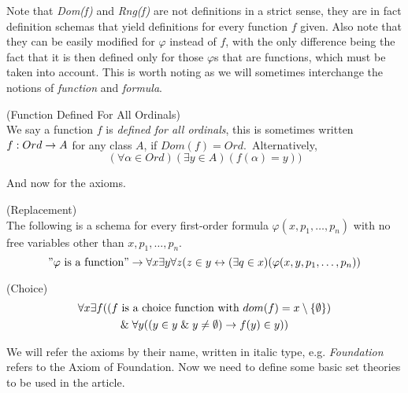 Note that \emph{Dom(f)} and \emph{Rng(f)} are not definitions in a strict sense, they are in fact definition schemas that yield definitions for every function $f$ given. Also note that they can be easily modified for $\varphi$ instead of $f$, with the only difference being the fact that it is then defined only for those $\varphi$s that are functions, which must be taken into account. This is worth noting as we will sometimes interchange the notions of \emph{function} and \emph{formula}.

\begin{definition}{(Function Defined For All Ordinals)}\label{def:function_dfao}\\
We say a function $f$ is \emph{defined for all ordinals}, this is sometimes written $f: Ord \rightarrow A$ for any class $A$, if $Dom(f) = Ord$.\
Alternatively,
\begin{equation}
(\forall \alpha \in Ord)(\exists y \in A)(f(\alpha) = y))
\end{equation}
\end{definition}

And now for the axioms.

\begin{definition}{(Replacement)}\label{def:replacement}\\
The following is a schema for every first-order formula $\varphi(x, p_1, \ldots, p_n)$ with no free variables other than $x, p_1, \ldots, p_n$.
\begin{equation}
"\varphi\mbox{ is a function}"\rightarrow \forall x \exists y \forall z (z \in y \leftrightarrow (\exists q \in x)(\varphi(x, y, p_1, \ldots, p_n))
\end{equation}
\end{definition}


\begin{definition}{(Choice)}\label{def:choice}\\
\begin{equation}
\begin{gathered}
\forall x \exists f ((f \mbox{ is a choice function with } dom(f) = x \setminus \{\emptyset\})\\
\mathrel{\&} \forall y ((y \in y \mathrel{\&} y \neq \emptyset) \rightarrow f(y) \in y))
\end{gathered}
\end{equation}
\end{definition}

We will refer the axioms by their name, written in italic type, e.g. \emph{Foundation} refers to the Axiom of Foundation. Now we need to define some basic set theories to be used in the article. 

